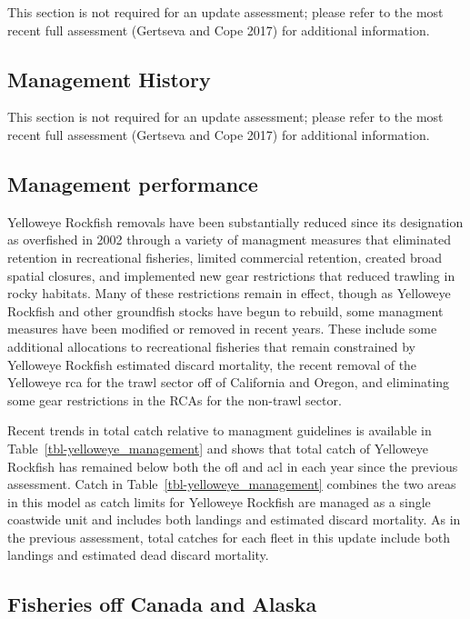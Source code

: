 \documentclass[
]{scrartcl}
\begin{document}
This section is not required for an update assessment; please refer to
the most recent full assessment (Gertseva and Cope 2017) for additional
information.

\subsection{Management History}\label{management-history}

This section is not required for an update assessment; please refer to
the most recent full assessment (Gertseva and Cope 2017) for additional
information.

\subsection{Management performance}\label{management-performance-1}

Yelloweye Rockfish removals have been substantially reduced since its
designation as overfished in 2002 through a variety of managment
measures that eliminated retention in recreational fisheries, limited
commercial retention, created broad spatial closures, and implemented
new gear restrictions that reduced trawling in rocky habitats. Many of
these restrictions remain in effect, though as Yelloweye Rockfish and
other groundfish stocks have begun to rebuild, some managment measures
have been modified or removed in recent years. These include some
additional allocations to recreational fisheries that remain constrained
by Yelloweye Rockfish estimated discard mortality, the recent removal of
the Yelloweye \gls{rca} for the trawl sector off of California and
Oregon, and eliminating some gear restrictions in the RCAs for the
non-trawl sector.

Recent trends in total catch relative to managment guidelines is
available in Table~\ref{tbl-yelloweye_management} and shows that total
catch of Yelloweye Rockfish has remained below both the \gls{ofl} and
\gls{acl} in each year since the previous assessment. Catch in
Table~\ref{tbl-yelloweye_management} combines the two areas in this
model as catch limits for Yelloweye Rockfish are managed as a single
coastwide unit and includes both landings and estimated discard
mortality. As in the previous assessment, total catches for each fleet
in this update include both landings and estimated dead discard
mortality.

\subsection{Fisheries off Canada and
Alaska}\label{fisheries-off-canada-and-alaska}
\end{document}
